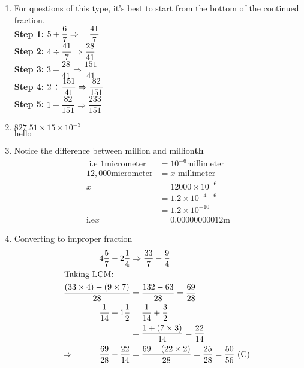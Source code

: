 \begin{multicols}{2}
\begin{enumerate}[label={\arabic*.}]
\item For questions of this type, it's best to start from the bottom of the continued fraction,\\
     \textbf{Step 1:} \hspace{10px}\( 5 + \dfrac{6}{7} \Rightarrow \hspace{10px} \dfrac{41}{7}\) \vspace{5px} \\
     \textbf{Step 2:} \hspace{10px}\(4 \divisionsymbol \dfrac{41}{7} \Rightarrow \dfrac{28}{41}  \) \vspace{5px} \\
     \textbf{Step 3:} \hspace{10px}\(3 + \dfrac{28}{41} \Rightarrow \dfrac{151}{41}\) \vspace{5px}\\
     \textbf{Step 4:} \hspace{10px}$2 \divisionsymbol \dfrac{151}{41} \Rightarrow \dfrac{82}{151}$\\
     \textbf{Step 5:} \hspace{10px} \( 1 + \dfrac{82}{151} \Rightarrow \dfrac{233}{151}\) \\ 
    
    \item \(827.51 \times 15 \times 10^{-3}\) \\
    \(\text{hello}\)
    \item Notice the difference between million and million\textbf{th}
    \begin{align*}
    \text{  i.e } 1 \text{micrometer} &= 10^{-6}\text{millimeter} \\
    12,000 \text{micrometer} &= x \text{ millimeter} \\
    x &= 12000 \times 10^{-6}  \\
    &= 1.2 \times 10^{-4 -6 } \\
    &= 1.2 \times 10^{-10} \\
    \text{i.e}  x &= 0.00000000012 \text{m}
    \end{align*}

    \item Converting to improper fraction 
    \begin{align*}
        4\dfrac{5}{7} - 2\dfrac{1}{4} &\Rightarrow \dfrac{33}{7} - \dfrac{9}{4} \\
        \text{Taking LCM:} \hspace{20px}\\
        \dfrac{(33\times 4) - (9 \times 7) }{28} &= \dfrac{132 - 63}{28} = \dfrac{69}{28} \\
        \dfrac{1}{14} + 1\dfrac{1}{2} &= \dfrac{1}{14} + \dfrac{3}{2} \\
        &= \dfrac{1 + (7 \times 3)}{14} = \dfrac{22}{14} \\
        \Rightarrow \hspace{30px} \dfrac{69}{28} - \dfrac{22}{14} &= \dfrac{69 - (22 \times 2)}{28} =  \dfrac{25}{28} = \dfrac{50}{56} \text{ (C) }
    \end{align*}


\end{enumerate}
\end{multicols}

